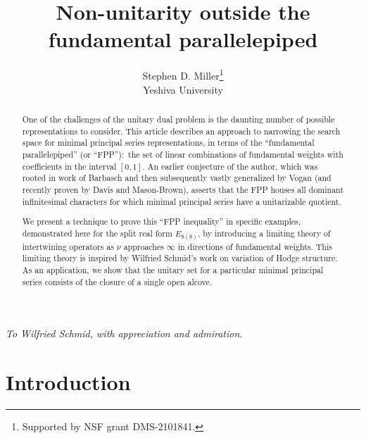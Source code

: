 \documentclass[12pt]{article}
\numberwithin{equation}{section}
\renewcommand\({\left(}
\renewcommand\){\right)}
\begin{document}
%



\title{Non-unitarity outside the fundamental parallelepiped}



\author{Stephen D. Miller\thanks{Supported by NSF grant DMS-2101841.}\\
Yeshiva University
}


\maketitle

\begin{center}
{\it To Wilfried Schmid, with appreciation and admiration.}
\end{center}


\begin{abstract}
One of the challenges of the unitary dual problem is the daunting number of possible representations to consider.  This article describes an approach to narrowing the search space for minimal principal series representations, in terms of the ``fundamental parallelepiped'' (or ``FPP''):~the set of linear combinations of fundamental weights with coefficients in the interval $[0,1]$.
An earlier conjecture of the author, which was rooted in work of  Barbasch and then subsequently vastly generalized by  Vogan (and recently proven by  Davis and  Mason-Brown), asserts that the FPP houses all dominant infinitesimal characters for which
minimal principal series have a unitarizable quotient.

We  present a technique to prove this ``FPP inequality'' in specific examples, demonstrated here for the split real form $E_{8(8)}$, by introducing a limiting theory of intertwining operators as $\nu$ approaches $\infty$ in directions of fundamental weights.
  This limiting theory is inspired by Wilfried Schmid's work on variation of Hodge structure.
As an application, we show that the unitary set for a particular minimal principal series consists of the closure of a single open alcove.
\end{abstract}





\section{Introduction}\label{sec:intro}
\end{document}
